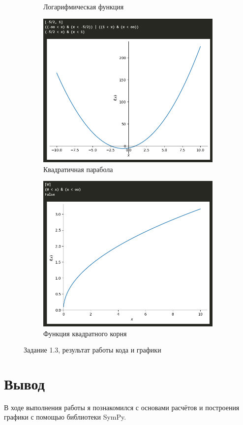 \documentclass[14pt,a4paper]{extarticle}
\begin{document}
\begin{figure}[!ht]
\begin{subfigure}{0.5\textwidth}
        \caption{Логарифмическая функция}
        \label{fig:1.3 ln}
    \end{subfigure}%
    \begin{subfigure}{0.5\textwidth}
        \centering
        \includegraphics[width=0.9\linewidth]{figures/1.3 sq.png}
        \caption{Квадратичная парабола}
        \label{fig:1.3 sq}
    \end{subfigure}%
    \begin{subfigure}{0.5\textwidth}
        \centering
        \includegraphics[width=0.9\linewidth]{figures/1.3 sqrt.png}
        \caption{Функция квадратного корня}
        \label{fig:1.3 sqrt}
    \end{subfigure}
    \caption{Задание 1.3, результат работы кода и графики}
    \label{fig:1.3}
\end{figure}

\section*{Вывод}
В ходе выполнения работы я познакомился с основами расчётов и построения графики
с помощью библиотеки SymPy.
\end{document}
